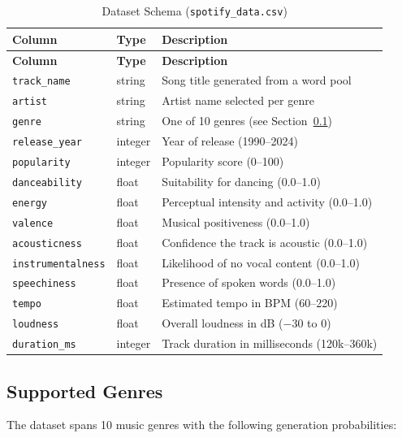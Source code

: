 \documentclass[12pt,a4paper]{article}
\begin{document}
\begin{longtable}{@{}llp{6.5cm}@{}}
\caption{Dataset Schema (\texttt{spotify\_data.csv})} \label{tab:schema} \\
\toprule
\textbf{Column} & \textbf{Type} & \textbf{Description} \\
\midrule
\endfirsthead
\toprule
\textbf{Column} & \textbf{Type} & \textbf{Description} \\
\midrule
\endhead
\texttt{track\_name}        & string  & Song title generated from a word pool \\
\texttt{artist}             & string  & Artist name selected per genre \\
\texttt{genre}              & string  & One of 10 genres (see Section~\ref{sec:genres}) \\
\texttt{release\_year}      & integer & Year of release (1990--2024) \\
\texttt{popularity}         & integer & Popularity score (0--100) \\
\texttt{danceability}       & float   & Suitability for dancing (0.0--1.0) \\
\texttt{energy}             & float   & Perceptual intensity and activity (0.0--1.0) \\
\texttt{valence}            & float   & Musical positiveness (0.0--1.0) \\
\texttt{acousticness}       & float   & Confidence the track is acoustic (0.0--1.0) \\
\texttt{instrumentalness}   & float   & Likelihood of no vocal content (0.0--1.0) \\
\texttt{speechiness}        & float   & Presence of spoken words (0.0--1.0) \\
\texttt{tempo}              & float   & Estimated tempo in BPM (60--220) \\
\texttt{loudness}           & float   & Overall loudness in dB ($-30$ to 0) \\
\texttt{duration\_ms}       & integer & Track duration in milliseconds (120k--360k) \\
\bottomrule
\end{longtable}

\subsection{Supported Genres}
\label{sec:genres}

The dataset spans 10 music genres with the following generation probabilities:
\end{document}
